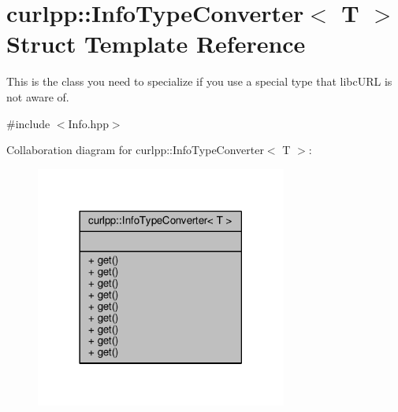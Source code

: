 \hypertarget{structcurlpp_1_1InfoTypeConverter}{\section{curlpp\-:\-:Info\-Type\-Converter$<$ T $>$ Struct Template Reference}
\label{structcurlpp_1_1InfoTypeConverter}
}


This is the class you need to specialize if you use a special type that libc\-U\-R\-L is not aware of.  




{\ttfamily \#include $<$Info.\-hpp$>$}



Collaboration diagram for curlpp\-:\-:Info\-Type\-Converter$<$ T $>$\-:
\nopagebreak
\begin{figure}[H]
\begin{center}
\leavevmode
\includegraphics[width=234pt]{structcurlpp_1_1InfoTypeConverter__coll__graph}
\end{center}
\end{figure}
